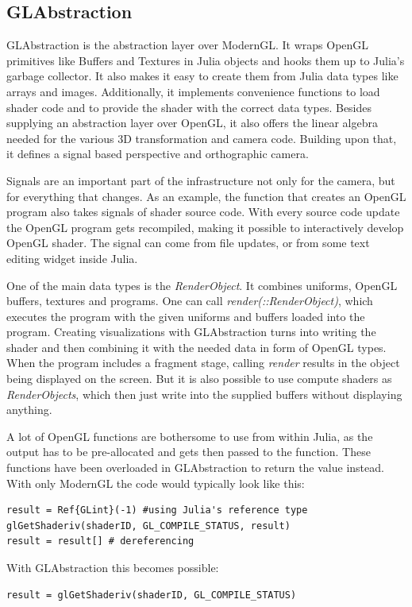 \subsection{GLAbstraction}
GLAbstraction is the abstraction layer over ModernGL.
It wraps \ac{OpenGL} primitives like Buffers and Textures in Julia objects and hooks them up to Julia's garbage collector. 
It also makes it easy to create them from Julia data types like arrays and images.
Additionally, it implements convenience functions to load shader code and to provide the shader with the correct data types.
Besides supplying an abstraction layer over \ac{OpenGL}, it also offers the linear algebra needed for the various 3D transformation and camera code.
Building upon that, it defines a signal based perspective and orthographic camera.

Signals are an important part of the infrastructure not only for the camera, but for everything that changes.
As an example, the function that creates an \ac{OpenGL} program also takes signals of shader source code. 
With every source code update the \ac{OpenGL} program gets recompiled, making it possible to interactively develop \ac{OpenGL} shader. The signal can come from file updates, or from some text editing widget inside Julia.

One of the main data types is the \textit{RenderObject}.
It combines uniforms, \ac{OpenGL} buffers, textures and programs. 
One can call \textit{render(::RenderObject)}, which executes the program with the given uniforms and buffers loaded into the program. 
Creating visualizations with GLAbstraction turns into writing the shader and then combining it with the needed data in form of OpenGL types.
When the program includes a fragment stage, calling \textit{render} results in the object being displayed on the screen. But it is also possible to use compute shaders as \textit{RenderObjects}, which then just write into the supplied buffers without displaying anything.

A lot of OpenGL functions are bothersome to use from within Julia, as the output has to be pre-allocated and gets then passed to the function.
These functions have been overloaded in GLAbstraction to return the value instead.
With only ModernGL the code would typically look like this:
\begin{lstlisting}
result = Ref{GLint}(-1) #using Julia's reference type
glGetShaderiv(shaderID, GL_COMPILE_STATUS, result)
result = result[] # dereferencing
\end{lstlisting}
With GLAbstraction this becomes possible:
\begin{lstlisting}
result = glGetShaderiv(shaderID, GL_COMPILE_STATUS)
\end{lstlisting}

